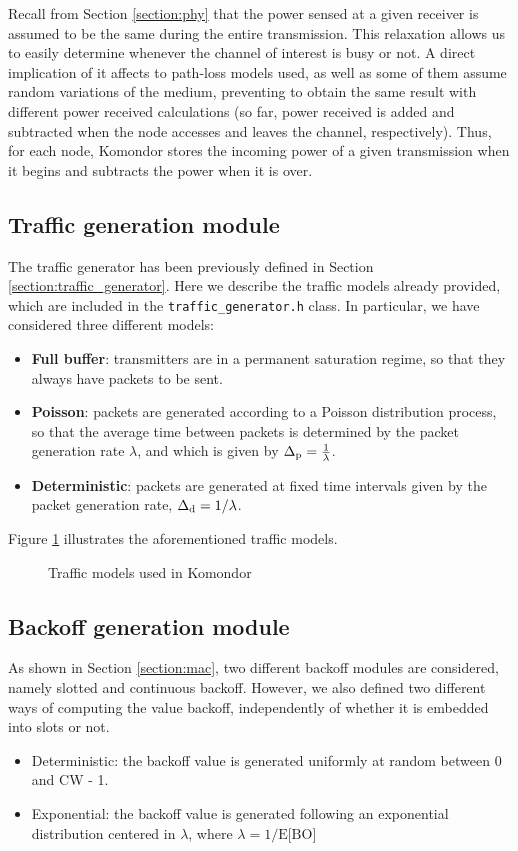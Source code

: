 \documentclass[a4paper]{article}
\begin{document}
Recall from Section \ref{section:phy} that the power sensed at a given receiver is assumed to be the same during the entire transmission. This relaxation allows us to easily determine whenever the channel of interest is busy or not. A direct implication of it affects to path-loss models used, as well as some of them assume random variations of the medium, preventing to obtain the same result with different power received calculations (so far, power received is added and subtracted when the node accesses and leaves the channel, respectively). Thus, for each node, Komondor stores the incoming power of a given transmission when it begins and subtracts the power when it is over. 

\subsection{Traffic generation module}
\label{section:traffic_modelling}
The traffic generator has been previously defined in Section \ref{section:traffic_generator}. Here we describe the traffic models already provided, which are included in the \texttt{traffic\_generator.h} class. In particular, we have considered three different models:
\begin{itemize}
	\item \textbf{Full buffer}: transmitters are in a permanent saturation regime, so that they always have packets to be sent.
	\item \textbf{Poisson}: packets are generated according to a Poisson distribution process, so that the average time between packets is determined by the packet generation rate $\lambda$, and which is given by $\Delta_{\rm p} = \frac{1}{\lambda}$.
	\item \textbf{Deterministic}: packets are generated at fixed time intervals given by the packet generation rate, $\Delta_{\rm d} = 1/\lambda$.
\end{itemize}

Figure \ref{fig:traffic_models} illustrates the aforementioned traffic models. 
\begin{figure}[h!]
	\centering
	\caption{Traffic models used in Komondor}
	\label{fig:traffic_models}
\end{figure}	

\subsection{Backoff generation module}
As shown in Section \ref{section:mac}, two different backoff modules are considered, namely slotted and continuous backoff. However, we also defined two different ways of computing the value backoff, independently of whether it is embedded into slots or not.
\begin{itemize}
	\item Deterministic: the backoff value is generated uniformly at random between 0 and CW - 1.
	\item Exponential: the backoff value is generated following an exponential distribution centered in $\lambda$, where $\lambda = 1/\text{E[BO]}$
\end{itemize}
\end{document}
